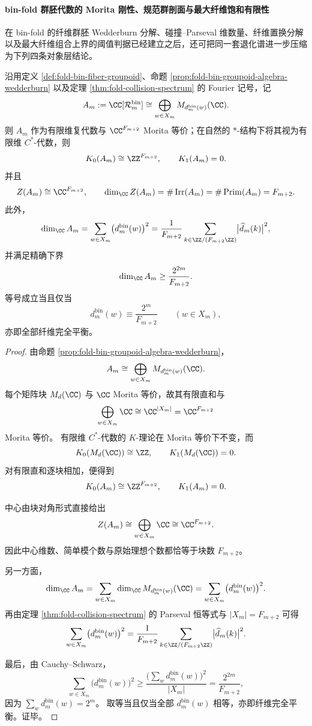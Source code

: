 \paragraph{bin-fold 群胚代数的 Morita 刚性、规范群剖面与最大纤维饱和有限性}
在 bin-fold 的纤维群胚 Wedderburn 分解、碰撞--Parseval 维数量、纤维置换分解以及最大纤维组合上界的阈值判据已经建立之后，还可把同一套退化谱进一步压缩为下列四条对象层结论。

\begin{theorem}\label{thm:xi-foldbin-groupoid-morita-k-center-dimension-lb}
沿用定义 \ref{def:fold-bin-fiber-groupoid}、命题 \ref{prop:fold-bin-groupoid-algebra-wedderburn} 以及定理 \ref{thm:fold-collision-spectrum} 的 Fourier 记号，记
\[
A_m:=\CC[\mathcal R_m^{\mathrm{bin}}]
\cong
\bigoplus_{w\in X_m}M_{d_m^{\mathrm{bin}}(w)}(\CC).
\]
则 \(A_m\) 作为有限维复代数与 \(\CC^{F_{m+2}}\) Morita 等价；在自然的 \(\ast\)-结构下将其视为有限维 \(C^\ast\)-代数，则
\[
K_0(A_m)\cong \ZZ^{F_{m+2}},
\qquad
K_1(A_m)=0.
\]
并且
\[
Z(A_m)\cong \CC^{F_{m+2}},
\qquad
\dim_{\CC}Z(A_m)
=
\#\operatorname{Irr}(A_m)
=
\#\operatorname{Prim}(A_m)
=
F_{m+2}.
\]
此外，
\[
\dim_{\CC}A_m
=
\sum_{w\in X_m}\bigl(d_m^{\mathrm{bin}}(w)\bigr)^2
=
\frac{1}{F_{m+2}}
\sum_{k\in \ZZ/(F_{m+2}\ZZ)}
\bigl|\widehat d_m(k)\bigr|^2,
\]
并满足精确下界
\[
\dim_{\CC}A_m\ge \frac{2^{2m}}{F_{m+2}}.
\]
等号成立当且仅当
\[
d_m^{\mathrm{bin}}(w)\equiv \frac{2^m}{F_{m+2}}
\qquad (w\in X_m),
\]
亦即全部纤维完全平衡。
\end{theorem}
\begin{proof}
由命题 \ref{prop:fold-bin-groupoid-algebra-wedderburn}，
\[
A_m\cong \bigoplus_{w\in X_m}M_{d_m^{\mathrm{bin}}(w)}(\CC).
\]
每个矩阵块 \(M_d(\CC)\) 与 \(\CC\) Morita 等价，故其有限直和与
\[
\bigoplus_{w\in X_m}\CC\cong \CC^{|X_m|}=\CC^{F_{m+2}}
\]
Morita 等价。
有限维 \(C^\ast\)-代数的 \(K\)-理论在 Morita 等价下不变，而
\[
K_0(M_d(\CC))\cong \ZZ,
\qquad
K_1(M_d(\CC))=0.
\]
对有限直和逐块相加，便得到
\[
K_0(A_m)\cong \ZZ^{F_{m+2}},
\qquad
K_1(A_m)=0.
\]

中心由块对角形式直接给出
\[
Z(A_m)\cong \bigoplus_{w\in X_m}\CC\cong \CC^{F_{m+2}}.
\]
因此中心维数、简单模个数与原始理想个数都恰等于块数 \(F_{m+2}\)。

另一方面，
\[
\dim_{\CC}A_m
=
\sum_{w\in X_m}\dim_{\CC}M_{d_m^{\mathrm{bin}}(w)}(\CC)
=
\sum_{w\in X_m}\bigl(d_m^{\mathrm{bin}}(w)\bigr)^2.
\]
再由定理 \ref{thm:fold-collision-spectrum} 的 Parseval 恒等式与
\(
|X_m|=F_{m+2}
\)
可得
\[
\sum_{w\in X_m}\bigl(d_m^{\mathrm{bin}}(w)\bigr)^2
=
\frac{1}{F_{m+2}}
\sum_{k\in \ZZ/(F_{m+2}\ZZ)}
\bigl|\widehat d_m(k)\bigr|^2.
\]

最后，由 Cauchy--Schwarz，
\[
\sum_{w\in X_m}\bigl(d_m^{\mathrm{bin}}(w)\bigr)^2
\ge
\frac{\bigl(\sum_w d_m^{\mathrm{bin}}(w)\bigr)^2}{|X_m|}
=
\frac{2^{2m}}{F_{m+2}},
\]
因为
\(
\sum_w d_m^{\mathrm{bin}}(w)=2^m
\)。
取等当且仅当全部 \(d_m^{\mathrm{bin}}(w)\) 相等，亦即纤维完全平衡。证毕。
\end{proof}

